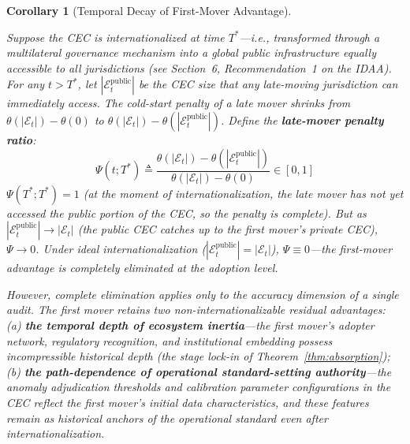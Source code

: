 \documentclass[12pt,a4paper]{article}
\newtheorem{corollary}[theorem]{Corollary}
\theoremstyle{definition}
\theoremstyle{remark}
\begin{document}
\begin{corollary}[Temporal Decay of First-Mover Advantage]
\begin{enumerate}[label=(\roman*), itemsep=6pt]
Suppose the CEC is internationalized at time $T^*$—i.e., transformed through a multilateral governance mechanism into a global public infrastructure equally accessible to all jurisdictions (see Section~6, Recommendation~1 on the IDAA). For any $t > T^*$, let $|\mathcal{E}_t^{\text{public}}|$ be the CEC size that any late-moving jurisdiction can immediately access. The cold-start penalty of a late mover shrinks from $\theta(|\mathcal{E}_t|) - \theta(0)$ to $\theta(|\mathcal{E}_t|) - \theta(|\mathcal{E}_t^{\text{public}}|)$. Define the \textbf{late-mover penalty ratio}:
\begin{equation}
\Psi(t; T^*) \triangleq \frac{\theta(|\mathcal{E}_t|) - \theta(|\mathcal{E}_t^{\text{public}}|)}{\theta(|\mathcal{E}_t|) - \theta(0)} \in [0, 1]
\end{equation}
$\Psi(T^*; T^*) = 1$ (at the moment of internationalization, the late mover has not yet accessed the public portion of the CEC, so the penalty is complete). But as $|\mathcal{E}_t^{\text{public}}| \to |\mathcal{E}_t|$ (the public CEC catches up to the first mover's private CEC), $\Psi \to 0$. Under ideal internationalization ($|\mathcal{E}_t^{\text{public}}| = |\mathcal{E}_t|$), $\Psi \equiv 0$—the first-mover advantage is completely eliminated at the adoption level.

However, complete elimination applies only to the accuracy dimension of a single audit. The first mover retains two \textit{non-internationalizable} residual advantages: (a) \textbf{the temporal depth of ecosystem inertia}—the first mover's adopter network, regulatory recognition, and institutional embedding possess incompressible historical depth (the stage lock-in of Theorem~\ref{thm:absorption}); (b) \textbf{the path-dependence of operational standard-setting authority}—the anomaly adjudication thresholds and calibration parameter configurations in the CEC reflect the first mover's initial data characteristics, and these features remain as historical anchors of the operational standard even after internationalization.


\end{enumerate}
\end{corollary}
\end{document}
